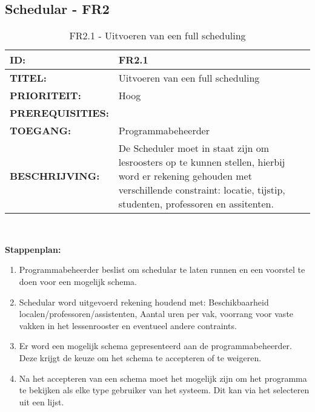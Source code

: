 \subsection{Schedular - FR2}

\noindent\begin{table}[H]
            \begin{tabular}{l | p{10cm}}
                \textbf{ID:} & FR2.1 \\ \hline
                \textbf{TITEL:} & Uitvoeren van een full scheduling\\ \hline
                \textbf{PRIORITEIT:} &  Hoog \\ \hline
                \textbf{PREREQUISITIES:} & \\ \hline
                \textbf{TOEGANG:} & Programmabeheerder \\ \hline
                \textbf{BESCHRIJVING:} & De Scheduler moet in staat zijn om lesroosters op te kunnen stellen, hierbij word er rekening gehouden met verschillende constraint: locatie, tijstip, studenten, professoren en assitenten. \\
            \end{tabular}\\
            \caption{FR2.1 - Uitvoeren van een full scheduling}
            \label{tab:FR2.1 - Uitvoeren van een full scheduling}
        \end{table}
      
\textbf{Stappenplan:}
	\begin{enumerate}
	\item Programmabeheerder beslist om schedular te laten runnen en een voorstel te doen voor een mogelijk schema.
	\item Schedular word uitgevoerd rekening houdend met: Beschikbaarheid localen/professoren/assistenten, Aantal uren per vak, voorrang voor vaste vakken in het lessenrooster en eventueel andere contraints.
	\item Er word een mogelijk schema gepresenteerd aan de programmabeheerder. Deze krijgt de keuze om het schema te accepteren of te weigeren.
	\item Na het accepteren van een schema moet het mogelijk zijn om het programma te bekijken als elke type gebruiker van het systeem. Dit kan via het selecteren uit een lijst.
	\end{enumerate}

